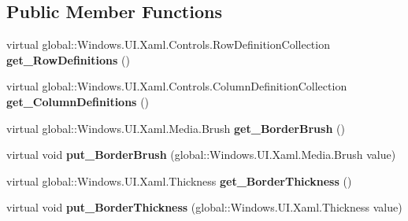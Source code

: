\subsection*{Public Member Functions}
\begin{DoxyCompactItemize}
\item 
\mbox{\label{class_windows_1_1_u_i_1_1_xaml_1_1_controls_1_1_grid_a462adf0bcc5ff89fd6198b69ea3935aa}} 
virtual global\+::\+Windows.\+U\+I.\+Xaml.\+Controls.\+Row\+Definition\+Collection {\bfseries get\+\_\+\+Row\+Definitions} ()
\item 
\mbox{\label{class_windows_1_1_u_i_1_1_xaml_1_1_controls_1_1_grid_a4e77f5fdadc303d53031e20fcabf5fc6}} 
virtual global\+::\+Windows.\+U\+I.\+Xaml.\+Controls.\+Column\+Definition\+Collection {\bfseries get\+\_\+\+Column\+Definitions} ()
\item 
\mbox{\label{class_windows_1_1_u_i_1_1_xaml_1_1_controls_1_1_grid_a56ab844ebf9b8faa820b652c2c5e592b}} 
virtual global\+::\+Windows.\+U\+I.\+Xaml.\+Media.\+Brush {\bfseries get\+\_\+\+Border\+Brush} ()
\item 
\mbox{\label{class_windows_1_1_u_i_1_1_xaml_1_1_controls_1_1_grid_a27800ef05d364a3b9417b09943ae92bf}} 
virtual void {\bfseries put\+\_\+\+Border\+Brush} (global\+::\+Windows.\+U\+I.\+Xaml.\+Media.\+Brush value)
\item 
\mbox{\label{class_windows_1_1_u_i_1_1_xaml_1_1_controls_1_1_grid_ae403f1f4e529c68e04423bf21fc36cc7}} 
virtual global\+::\+Windows.\+U\+I.\+Xaml.\+Thickness {\bfseries get\+\_\+\+Border\+Thickness} ()
\item 
\mbox{\label{class_windows_1_1_u_i_1_1_xaml_1_1_controls_1_1_grid_a7ec7f388cb8d2882e412b29d60fb8e78}} 
virtual void {\bfseries put\+\_\+\+Border\+Thickness} (global\+::\+Windows.\+U\+I.\+Xaml.\+Thickness value)
\item 
\mbox{\label{class_windows_1_1_u_i_1_1_xaml_1_1_controls_1_1_grid_a8a9435e4defeeee271d7eef51280e839}} 

\end{DoxyCompactItemize}
